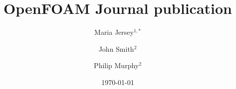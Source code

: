 \documentclass[e-only,10pt,reqno]{ofj}
\newcommand{\OF}[0]{OpenFOAM\textsuperscript{\textregistered} }
\begin{document}


\title[\OF Journal publication]{\OF Journal publication}

\ifdefined\review
  \author{}
  \address{}
  \email{}
\else



\author[M. Jersey]{Maria Jersey$^{1,*}$}
\address{$^1$Address1}

\author[J. Smith]{John Smith$^2$}
\address{$^2$Address2} %

\author[P. Murphy]{Philip Murphy$^2$} %
\fi






\date{\today}

\dedicatory{}


\maketitle

\ifdefined\review
  \linenumbers
\else
\fi




\end{document}
